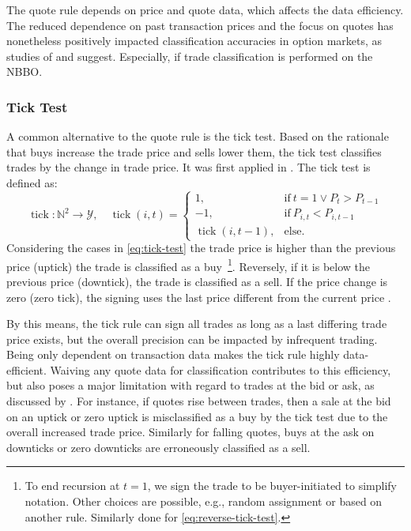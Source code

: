 The quote rule depends on price and quote data, which affects the data efficiency. The reduced dependence on past transaction prices and the focus on quotes has nonetheless positively impacted classification accuracies in option markets, as studies of \textcite[][886]{savickasInferringDirectionOption2003} and \textcite[][3]{grauerOptionTradeClassification2022} suggest. Especially, if trade classification is performed on the \gls{NBBO}.


\subsubsection{Tick Test}\label{sec:tick-test}

A common alternative to the quote rule is the tick test. Based on the rationale that buys increase the trade price and sells lower them, the tick test classifies trades by the change in trade price. It was first applied in \textcites[][244]{holthausenEffectLargeBlock1987}[][240]{hasbrouckTradesQuotesInventories1988}. The tick test is defined as:
\begin{equation}
    \operatorname{tick}\colon \mathbb{N}^2 \to \mathcal{Y},\quad
    \operatorname{tick}(i, t)=
    \begin{cases}
        1,                           & \mathrm{if}\ t=1 \lor P_{t}>P_{t-1} \\
        -1,                          & \mathrm{if}\ P_{i, t} < P_{i, t-1}  \\
        \operatorname{tick}(i, t-1), & \mathrm{else}.
    \end{cases}
    \label{eq:tick-test}
\end{equation}
Considering the cases in \cref{eq:tick-test} the trade price is higher than the previous price (uptick) the trade is classified as a buy~\footnote{To end recursion at $t=1$, we sign the trade to be buyer-initiated to simplify notation. Other choices are possible, e.g., random assignment or based on another rule. Similarly done for \cref{eq:reverse-tick-test}.}. Reversely, if it is below the previous price (downtick), the trade is classified as a sell. If the price change is zero (zero tick), the signing uses the last price different from the current price \autocite[][735]{leeInferringTradeDirection1991}.

By this means, the tick rule can sign all trades as long as a last differing trade price exists, but the overall precision can be impacted by infrequent trading. Being only dependent on transaction data makes the tick rule highly data-efficient. Waiving any quote data for classification contributes to this efficiency, but also poses a major limitation with regard to trades at the bid or ask, as discussed by \textcite[][557--558]{finucaneDirectTestMethods2000}. For instance, if quotes rise between trades, then a sale at the bid on an uptick or zero uptick is misclassified as a buy by the tick test due to the overall increased trade price. Similarly for falling quotes, buys at the ask on downticks or zero downticks are erroneously classified as a sell.


